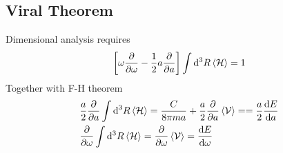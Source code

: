 \documentclass{article}
\begin{document}
    \subsection{Viral Theorem}
    Dimensional analysis requires 
    \begin{align}
        \bqty{\omega\pdv{\omega}-\frac{1}{2}a\pdv{a}}\int\dd^3R\expval{\mathcal{H}}=1
    \end{align}
    Together with F-H theorem 
    \begin{align}
        &\frac{a}{2}\pdv{a}\int\dd^3R\expval{\mathcal{H}}=\frac{C}{8\pi m a}+\frac{a}{2}\pdv{a}\expval{\mathcal{V}}==\frac{a}{2}\dv{E}{a}\\
        &\pdv{\omega}\int\dd^3R\expval{\mathcal{H}}=\pdv{\omega}\expval{\mathcal{V}}=\dv{E}{\omega}
    \end{align}
\end{document}
